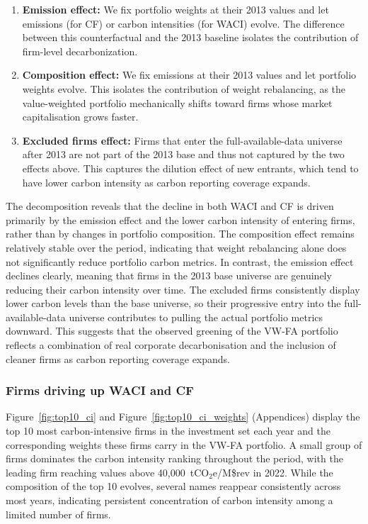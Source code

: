 \documentclass[11pt,a4paper]{article}
\begin{document}
\begin{enumerate}[leftmargin=*]
    \item \textbf{Emission effect:} We fix portfolio weights at their 2013 values and let emissions (for CF) or carbon intensities (for WACI) evolve. The difference between this counterfactual and the 2013 baseline isolates the contribution of firm-level decarbonization.
    \newpage
    \item \textbf{Composition effect:} We fix emissions at their 2013 values and let portfolio weights evolve. This isolates the contribution of weight rebalancing, as the value-weighted portfolio mechanically shifts toward firms whose market capitalisation grows faster.
    \item \textbf{Excluded firms effect:} Firms that enter the full-available-data universe after 2013 are not part of the 2013 base and thus not captured by the two effects above. This captures the dilution effect of new entrants, which tend to have lower carbon intensity as carbon reporting coverage expands.
\end{enumerate}

The decomposition reveals that the decline in both WACI and CF is driven primarily by the emission effect and the lower carbon intensity of entering firms, rather than by changes in portfolio composition. The composition effect remains relatively stable over the period, indicating that weight rebalancing alone does not significantly reduce portfolio carbon metrics. In contrast, the emission effect declines clearly, meaning that firms in the 2013 base universe are genuinely reducing their carbon intensity over time. The excluded firms consistently display lower carbon levels than the base universe, so their progressive entry into the full-available-data universe contributes to pulling the actual portfolio metrics downward. This suggests that the observed greening of the VW-FA portfolio reflects a combination of real corporate decarbonisation and the inclusion of cleaner firms as carbon reporting coverage expands.

\subsubsection{Firms driving up WACI and CF}

Figure~\ref {fig:top10_ci} and Figure~\ref {fig:top10_ci_weights} (Appendices) display the top 10 most carbon-intensive firms in the investment set each year and the corresponding weights these firms carry in the VW-FA portfolio. A small group of firms dominates the carbon intensity ranking throughout the period, with the leading firm reaching values above 40,000~tCO$_2$e/M\$rev in 2022. While the composition of the top 10 evolves, several names reappear consistently across most years, indicating persistent concentration of carbon intensity among a limited number of firms.
\end{document}
